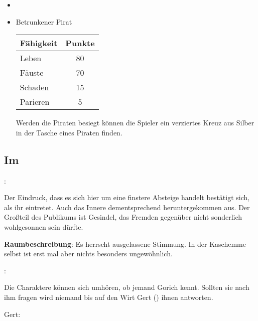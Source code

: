 \begin{itemize}
  \item {} \\
  \item \textbf{} Betrunkener Pirat \\
\begin{center}
  \begin{tabular}{lc}
    \toprule
    Fähigkeit & Punkte \\
    \midrule
    Leben & 80 \\
    Fäuste & 70 \\
    Schaden & 15 \\
    Parieren & 5 \\
    \bottomrule
  \end{tabular}
\end{center}

Werden die Piraten besiegt können die Spieler ein verziertes Kreuz aus Silber in der Tasche eines Piraten finden.

\end{itemize}

\subsection{Im }
\label{imhund}

:

Der Eindruck, dass es sich hier um eine finstere Absteige handelt bestätigt sich, als ihr eintretet. Auch das Innere dementsprechend heruntergekommen aus. Der Großteil des Publikums ist Gesindel, das Fremden gegenüber nicht sonderlich wohlgesonnen sein dürfte.

\textbf{Raumbeschreibung}: Es herrscht ausgelassene Stimmung. In der Kaschemme selbst ist erst mal aber nichts besonders ungewöhnlich.

:

Die Charaktere können sich umhören, ob jemand Gorich kennt. Sollten sie nach ihm fragen wird niemand bis auf den Wirt Gert (\blue{\ref{Gert}}) ihnen antworten.

Gert: 

